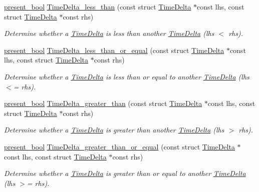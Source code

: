 \begin{DoxyCompactItemize}
\hyperlink{types_8h_a1c24e2cdd988b886e889080ded176ae0}{present\-\_\-bool} \hyperlink{time-delta_8h_a17c72c9312884c0aabbfbcc6c195fa5e}{Time\-Delta\-\_\-less\-\_\-than} (const struct \hyperlink{structTimeDelta}{Time\-Delta} $\ast$const lhs, const struct \hyperlink{structTimeDelta}{Time\-Delta} $\ast$const rhs)
\begin{DoxyCompactList}\small\item\em Determine whether a \hyperlink{structTimeDelta}{Time\-Delta} is less than another \hyperlink{structTimeDelta}{Time\-Delta} (lhs $<$ rhs). \end{DoxyCompactList}\item 
\hyperlink{types_8h_a1c24e2cdd988b886e889080ded176ae0}{present\-\_\-bool} \hyperlink{time-delta_8h_a719a2e8e64a3f680cff26b4d871a61d3}{Time\-Delta\-\_\-less\-\_\-than\-\_\-or\-\_\-equal} (const struct \hyperlink{structTimeDelta}{Time\-Delta} $\ast$const lhs, const struct \hyperlink{structTimeDelta}{Time\-Delta} $\ast$const rhs)
\begin{DoxyCompactList}\small\item\em Determine whether a \hyperlink{structTimeDelta}{Time\-Delta} is less than or equal to another \hyperlink{structTimeDelta}{Time\-Delta} (lhs $<$= rhs). \end{DoxyCompactList}\item 
\hyperlink{types_8h_a1c24e2cdd988b886e889080ded176ae0}{present\-\_\-bool} \hyperlink{time-delta_8h_aaf70b7980933d5b2eb4261197da08d20}{Time\-Delta\-\_\-greater\-\_\-than} (const struct \hyperlink{structTimeDelta}{Time\-Delta} $\ast$const lhs, const struct \hyperlink{structTimeDelta}{Time\-Delta} $\ast$const rhs)
\begin{DoxyCompactList}\small\item\em Determine whether a \hyperlink{structTimeDelta}{Time\-Delta} is greater than another \hyperlink{structTimeDelta}{Time\-Delta} (lhs $>$ rhs). \end{DoxyCompactList}\item 
\hyperlink{types_8h_a1c24e2cdd988b886e889080ded176ae0}{present\-\_\-bool} \hyperlink{time-delta_8h_afc8207e3bd84d8037f99ad99a0c76b04}{Time\-Delta\-\_\-greater\-\_\-than\-\_\-or\-\_\-equal} (const struct \hyperlink{structTimeDelta}{Time\-Delta} $\ast$const lhs, const struct \hyperlink{structTimeDelta}{Time\-Delta} $\ast$const rhs)
\begin{DoxyCompactList}\small\item\em Determine whether a \hyperlink{structTimeDelta}{Time\-Delta} is greater than or equal to another \hyperlink{structTimeDelta}{Time\-Delta} (lhs $>$= rhs). \end{DoxyCompactList}\end{DoxyCompactItemize}


